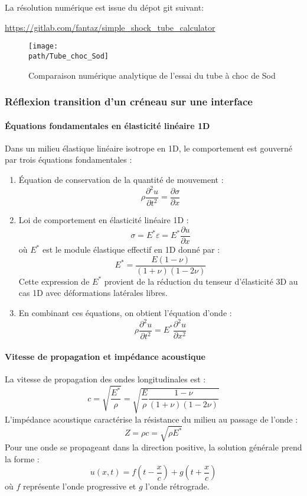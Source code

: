 \documentclass[10pt]{book}
\def\path{./fig}
\begin{document}
La résolution numérique est issue du dépot git suivant:
\begin{center}
\url{https://gitlab.com/fantaz/simple_shock_tube_calculator}
\end{center}
\begin{figure}[h!]
\centering \texttt{[image: \\path/Tube\_choc\_Sod]}
\caption{Comparaison numérique analytique de l'essai du tube à choc de Sod}
\label{fig:comparaison_SOD}
\end{figure}
\subsubsection{Réflexion transition d'un créneau sur une interface}
\paragraph{Équations fondamentales en élasticité linéaire 1D}
Dans un milieu élastique linéaire isotrope en 1D, le comportement est gouverné par trois équations fondamentales :
\begin{enumerate}
\item Équation de conservation de la quantité de mouvement :
$$\rho \frac{\partial^2 u}{\partial t^2} = \frac{\partial \sigma}{\partial x}$$
\item Loi de comportement en élasticité linéaire 1D :
$$\sigma = E^* \varepsilon = E^* \frac{\partial u}{\partial x}$$
où $E^*$ est le module élastique effectif en 1D donné par :
$$E^* = \frac{E(1-\nu)}{(1+\nu)(1-2\nu)}$$
Cette expression de $E^*$ provient de la réduction du tenseur d'élasticité 3D au cas 1D avec déformations latérales libres.
\item En combinant ces équations, on obtient l'équation d'onde :
$$\rho \frac{\partial^2 u}{\partial t^2} = E^* \frac{\partial^2 u}{\partial x^2}$$
\end{enumerate}
\paragraph{Vitesse de propagation et impédance acoustique}
La vitesse de propagation des ondes longitudinales est :
$$c = \sqrt{\frac{E^*}{\rho}} = \sqrt{\frac{E}{\rho} \frac{1-\nu}{(1+\nu)(1-2\nu)}}$$
L'impédance acoustique caractérise la résistance du milieu au passage de l'onde :
$$Z = \rho c = \sqrt{\rho E^*}$$
Pour une onde se propageant dans la direction positive, la solution générale prend la forme :
$$u(x,t) = f(t - \frac{x}{c}) + g(t + \frac{x}{c})$$
où $f$ représente l'onde progressive et $g$ l'onde rétrograde.
\end{document}

